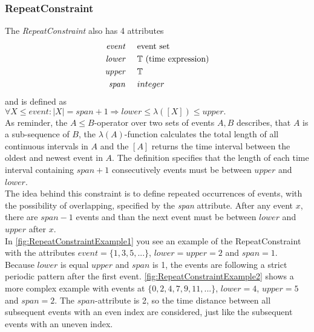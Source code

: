 	\subsubsection{RepeatConstraint}
		The \emph{RepeatConstraint} also has 4 attributes
		\begin{align*}
			\emph{event} & \hspace{.5cm}\text{event set}\\
			\emph{lower} & \hspace{.5cm}\text{$\mathbb{T}$ (time expression)}\\
			\emph{upper} & \hspace{.5cm}\text{$\mathbb{T}$}\\
			\emph{span}	 & \hspace{.5cm}\text{$integer$}\\
		\end{align*}
		and is defined as\\[10pt]
		\begin{math}
			\forall X\leq event: |X|=span+1\Rightarrow lower \leq \lambda([X])\leq upper.
		\end{math}\\[10pt]
		As reminder, the $A\leq B$-operator over two sets of events $A, B$ describes, that $A$ is a sub-sequence of $B$, the $\lambda(A)$-function calculates the total length of all continuous intervals in $A$ and the $[A]$ returns the time interval between the oldest and newest event in $A$.
		The definition specifies that the length of each time interval containing $span+1$ consecutively events must be between $upper$ and $lower$.\\
		The idea behind this constraint is to define repeated occurrences of events, with the possibility of overlapping, specified by the \emph{span} attribute. After any event $x$, there are $span-1$ events and than the next event must be between $lower$ and $upper$ after $x$.\\
		In \ref{fig:RepeatConstraintExample1} you see an example of the RepeatConstraint with the attributes $event=\{1,3,5,...\}$, $lower=upper=2$ and $span=1$. Because $lower$ is equal $upper$ and $span$ is 1, the events are following a strict periodic pattern after the first event. \ref{fig:RepeatConstraintExample2} shows a more complex example with events at $\{0, 2, 4, 7, 9, 11,...\}$, $lower=4$, $upper=5$ and $span=2$. The $span$-attribute is 2, so the time distance between all subsequent events with an even index are considered, just like the subsequent events with an uneven index. 
		
